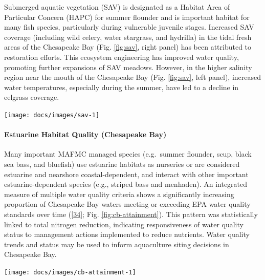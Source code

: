 \documentclass[
  10pt,
]{article}
\let\origfigure\figure
\let\endorigfigure\endfigure
\renewenvironment{figure}[1][2] {
    \expandafter\origfigure\expandafter[H]
} {
    \endorigfigure
}
\begin{document}
Submerged aquatic vegetation (SAV) is designated as a Habitat Area of
Particular Concern (HAPC) for summer flounder and is important habitat
for many fish species, particularly during vulnerable juvenile stages.
Increased SAV coverage (including wild celery, water stargrass, and
hydrilla) in the tidal fresh areas of the Chesapeake Bay (Fig.
\ref{fig:sav}, right panel) has been attributed to restoration efforts.
This ecosystem engineering has improved water quality, promoting further
expansions of SAV meadows. However, in the higher salinity region near
the mouth of the Chesapeake Bay (Fig. \ref{fig:sav}, left panel),
increased water temperatures, especially during the summer, have led to
a decline in eelgrass coverage.

\begin{figure}

{\centering \texttt{[image: docs/images/sav-1]} 

}

\end{figure}

\hypertarget{estuarine-habitat-quality-chesapeake-bay}{%
\paragraph{Estuarine Habitat Quality (Chesapeake
Bay)}\label{estuarine-habitat-quality-chesapeake-bay}}

Many important MAFMC managed species (e.g.~summer flounder, scup, black
sea bass, and bluefish) use estuarine habitats as nurseries or are
considered estuarine and nearshore coastal-dependent, and interact with
other important estuarine-dependent species (e.g., striped bass and
menhaden). An integrated measure of multiple water quality criteria
shows a significantly increasing proportion of Chesapeake Bay waters
meeting or exceeding EPA water quality standards over time
({[}\protect\hyperlink{ref-zhang_chesapeake_2018}{34}{]}; Fig.
\ref{fig:cb-attainment}). This pattern was statistically linked to total
nitrogen reduction, indicating responsiveness of water quality status to
management actions implemented to reduce nutrients. Water quality trends
and status may be used to inform aquaculture siting decisions in
Chesapeake Bay.

\begin{figure}

{\centering \texttt{[image: docs/images/cb-attainment-1]} 

}

\caption{Water quality attainment in Chesapeake Bay following rolling three year assessment periods.}\label{fig:cb-attainment}
\end{figure}
\end{document}
